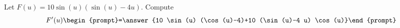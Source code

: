 \documentclass{ximera}
\author{Bart Snapp}
\begin{document}
\begin{exercise}
Let $F(u) = 10 \sin (u) (\sin (u)-4 u)$. Compute
\[
F'(u)
\begin{prompt}=\answer{10 \sin (u) (\cos (u)-4)+10 (\sin (u)-4 u) \cos (u)}\end{prompt}
\]
\end{exercise}
\end{document}
